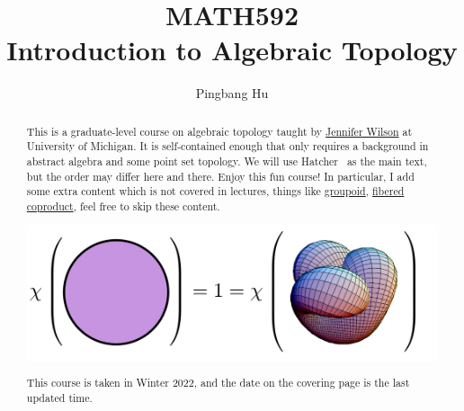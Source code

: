 \documentclass[a4paper]{report}
\author{Pingbang Hu}
\title{MATH592\\Introduction to Algebraic Topology}
\begin{document}
\maketitle

\begin{abstract}
	This is a graduate-level course on algebraic topology taught by \href{http://www.math.lsa.umich.edu/~jchw/}{Jennifer Wilson} at University of Michigan. It is self-contained enough that only requires a background in abstract algebra and some point set topology. We will use Hatcher~\cite{hatcher2002algebraic} as the main text, but the order may differ here and there. Enjoy this fun course! In particular, I add some extra content which is not covered in lectures, things like \hyperref[def:groupoid]{groupoid}, \hyperref[def:fibered-coproduct]{fibered coproduct}, feel free to skip these content.

	\vfill
	\begin{center}
		\includegraphics[width=.8\linewidth]{Figures/cover.png}
	\end{center}
	\vfill
	This course is taken in Winter 2022, and the date on the covering page is the last updated time.
\end{abstract}

\tableofcontents

\newpage


\newpage
\appendix
\appendixpage



\newpage
\printbibliography
\end{document}
